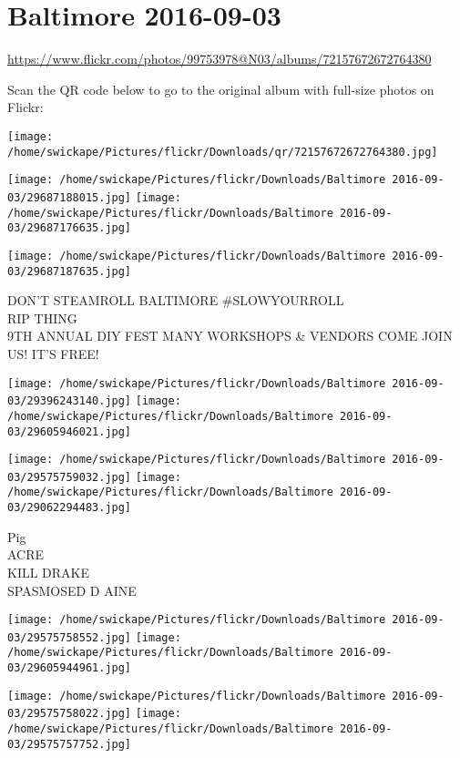 \documentclass[10pt,letterpaper]{article}
\title{}
\author{}
\date{}
\begin{document}
\section*{Baltimore 2016-09-03}

\url{https://www.flickr.com/photos/99753978@N03/albums/72157672672764380}

Scan the QR code below to go to the original album with full-size photos on Flickr:

\texttt{[image: /home/swickape/Pictures/flickr/Downloads/qr/72157672672764380.jpg]}
\pagebreak

\texttt{[image: /home/swickape/Pictures/flickr/Downloads/Baltimore 2016-09-03/29687188015.jpg]}
\texttt{[image: /home/swickape/Pictures/flickr/Downloads/Baltimore 2016-09-03/29687176635.jpg]}

\vspace{0.25in}
\texttt{[image: /home/swickape/Pictures/flickr/Downloads/Baltimore 2016-09-03/29687187635.jpg]}

DON'T STEAMROLL BALTIMORE \#SLOWYOURROLL\\
RIP THING\\
9TH ANNUAL DIY FEST MANY WORKSHOPS \& VENDORS COME JOIN US!  IT'S FREE!
\pagebreak

\texttt{[image: /home/swickape/Pictures/flickr/Downloads/Baltimore 2016-09-03/29396243140.jpg]}
\texttt{[image: /home/swickape/Pictures/flickr/Downloads/Baltimore 2016-09-03/29605946021.jpg]}

\texttt{[image: /home/swickape/Pictures/flickr/Downloads/Baltimore 2016-09-03/29575759032.jpg]}
\texttt{[image: /home/swickape/Pictures/flickr/Downloads/Baltimore 2016-09-03/29062294483.jpg]}

Pig\\
ACRE\\
KILL DRAKE\\
SPASMOSED D AINE
\pagebreak

\texttt{[image: /home/swickape/Pictures/flickr/Downloads/Baltimore 2016-09-03/29575758552.jpg]}
\texttt{[image: /home/swickape/Pictures/flickr/Downloads/Baltimore 2016-09-03/29605944961.jpg]}

\texttt{[image: /home/swickape/Pictures/flickr/Downloads/Baltimore 2016-09-03/29575758022.jpg]}
\texttt{[image: /home/swickape/Pictures/flickr/Downloads/Baltimore 2016-09-03/29575757752.jpg]}
\end{document}
